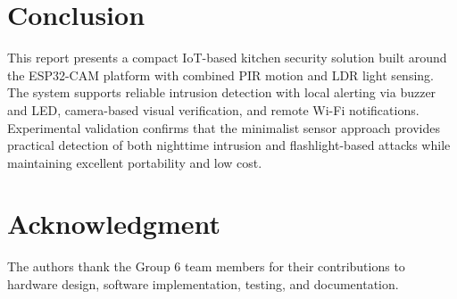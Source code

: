 \documentclass[conference]{IEEEtran}
\begin{document}
\section{Conclusion}
This report presents a compact IoT-based kitchen security solution built around the ESP32-CAM platform with combined PIR motion and LDR light sensing. The system supports reliable intrusion detection with local alerting via buzzer and LED, camera-based visual verification, and remote Wi-Fi notifications. Experimental validation confirms that the minimalist sensor approach provides practical detection of both nighttime intrusion and flashlight-based attacks while maintaining excellent portability and low cost.

\section*{Acknowledgment}
The authors thank the Group 6 team members for their contributions to hardware design, software implementation, testing, and documentation.



%
\end{document}
